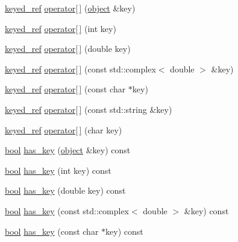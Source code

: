 \begin{DoxyCompactItemize}
\item 
\hyperlink{classpy_1_1object_1_1keyed__ref}{keyed\+\_\+ref} \hyperlink{classpy_1_1dict_aec65c02cf9883f86d118d5a8d2ccccf9}{operator\mbox{[}$\,$\mbox{]}} (\hyperlink{classpy_1_1object}{object} \&key)
\item 
\hyperlink{classpy_1_1object_1_1keyed__ref}{keyed\+\_\+ref} \hyperlink{classpy_1_1dict_a2cc5e49061d394a169aa21a75a72473b}{operator\mbox{[}$\,$\mbox{]}} (int key)
\item 
\hyperlink{classpy_1_1object_1_1keyed__ref}{keyed\+\_\+ref} \hyperlink{classpy_1_1dict_a88b9d71b8f3f1cff29775a4497c5fb3e}{operator\mbox{[}$\,$\mbox{]}} (double key)
\item 
\hyperlink{classpy_1_1object_1_1keyed__ref}{keyed\+\_\+ref} \hyperlink{classpy_1_1dict_a7cabffa56c79985667670ed7051bd2d1}{operator\mbox{[}$\,$\mbox{]}} (const std\+::complex$<$ double $>$ \&key)
\item 
\hyperlink{classpy_1_1object_1_1keyed__ref}{keyed\+\_\+ref} \hyperlink{classpy_1_1dict_a90436dbd33e9e305aac2e83bd799a690}{operator\mbox{[}$\,$\mbox{]}} (const char $\ast$key)
\item 
\hyperlink{classpy_1_1object_1_1keyed__ref}{keyed\+\_\+ref} \hyperlink{classpy_1_1dict_a5efcedae9d9e43042cdbd0ed0aacb1ff}{operator\mbox{[}$\,$\mbox{]}} (const std\+::string \&key)
\item 
\hyperlink{classpy_1_1object_1_1keyed__ref}{keyed\+\_\+ref} \hyperlink{classpy_1_1dict_ae5079ca327fac53617d174bda412329f}{operator\mbox{[}$\,$\mbox{]}} (char key)
\item 
\hyperlink{compiler_8h_abb452686968e48b67397da5f97445f5b}{bool} \hyperlink{classpy_1_1dict_a0ca12de09f061f31fc43e806abd049cf}{has\+\_\+key} (\hyperlink{classpy_1_1object}{object} \&key) const 
\item 
\hyperlink{compiler_8h_abb452686968e48b67397da5f97445f5b}{bool} \hyperlink{classpy_1_1dict_ac3f1fee960acd01e437898056b1996c0}{has\+\_\+key} (int key) const 
\item 
\hyperlink{compiler_8h_abb452686968e48b67397da5f97445f5b}{bool} \hyperlink{classpy_1_1dict_a3092c15f19f2541ea7a3bef58c6834ca}{has\+\_\+key} (double key) const 
\item 
\hyperlink{compiler_8h_abb452686968e48b67397da5f97445f5b}{bool} \hyperlink{classpy_1_1dict_a57a326b3019b2a7cbec57e2ca61c4301}{has\+\_\+key} (const std\+::complex$<$ double $>$ \&key) const 
\item 
\hyperlink{compiler_8h_abb452686968e48b67397da5f97445f5b}{bool} \hyperlink{classpy_1_1dict_a3fe548c081f02d6dee2d502474156c09}{has\+\_\+key} (const char $\ast$key) const 

\end{DoxyCompactItemize}
